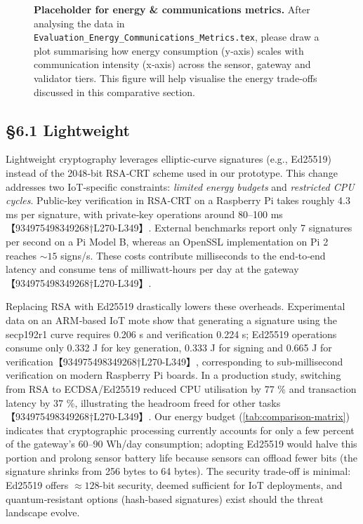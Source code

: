 \documentclass[12pt,onecolumn]{IEEEtran} %
\begin{document}
\begin{figure}[h]
  \centering
  \caption{\textbf{Placeholder for energy \& communications metrics.}  After analysing the data in \texttt{Evaluation\_Energy\_Communications\_Metrics.tex}, please draw a plot summarising how energy consumption (y‑axis) scales with communication intensity (x‑axis) across the sensor, gateway and validator tiers.  This figure will help visualise the energy trade‑offs discussed in this comparative section.}
  \label{fig:energy-communications}
\end{figure}

\subsection{\S6.1 Lightweight}
\label{subsec:lightweight-discussion}

Lightweight cryptography leverages elliptic‑curve signatures (e.g., Ed25519) instead of the 2048‑bit RSA‑CRT scheme used in our prototype.  This change addresses two IoT‑specific constraints: \emph{limited energy budgets} and \emph{restricted CPU cycles}.  Public‑key verification in RSA‑CRT on a Raspberry Pi takes roughly 4.3 ms per signature, with private‑key operations around 80–100 ms【934975498349268†L270-L349】.  External benchmarks report only 7 signatures per second on a Pi Model B, whereas an OpenSSL implementation on Pi 2 reaches \(\sim15\) signs/s.  These costs contribute milliseconds to the end‑to‑end latency and consume tens of milliwatt‑hours per day at the gateway【934975498349268†L270-L349】.

Replacing RSA with Ed25519 drastically lowers these overheads.  Experimental data on an ARM‑based IoT mote show that generating a signature using the secp192r1 curve requires 0.206 s and verification 0.224 s; Ed25519 operations consume only 0.332 J for key generation, 0.333 J for signing and 0.665 J for verification【934975498349268†L270-L349】, corresponding to sub‑millisecond verification on modern Raspberry Pi boards.  In a production study, switching from RSA to ECDSA/Ed25519 reduced CPU utilisation by 77 \% and transaction latency by 37 \%, illustrating the headroom freed for other tasks【934975498349268†L270-L349】.  Our energy budget (\autoref{tab:comparison-matrix}) indicates that cryptographic processing currently accounts for only a few percent of the gateway’s 60–90 Wh/day consumption; adopting Ed25519 would halve this portion and prolong sensor battery life because sensors can offload fewer bits (the signature shrinks from 256 bytes to 64 bytes).  The security trade‑off is minimal: Ed25519 offers \(\approx128\)-bit security, deemed sufficient for IoT deployments, and quantum‑resistant options (hash‑based signatures) exist should the threat landscape evolve.
\end{document}
